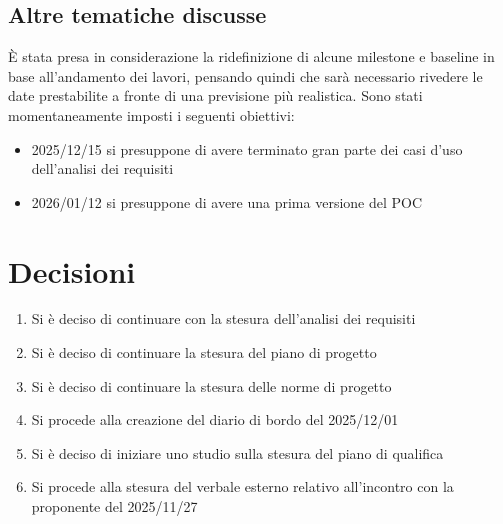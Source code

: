 \documentclass[a4paper,12pt]{article}
\begin{document}
\subsection{Altre tematiche discusse}
È stata presa in considerazione la ridefinizione di alcune milestone e baseline in base all'andamento dei lavori, pensando quindi che sarà necessario rivedere le date prestabilite a fronte di una previsione più realistica.
Sono stati momentaneamente imposti i seguenti obiettivi:
\begin{itemize}[noitemsep]
    \item 2025/12/15 si presuppone di avere terminato gran parte dei casi d'uso dell'analisi dei requisiti
    \item 2026/01/12 si presuppone di avere una prima versione del POC
\end{itemize}

\section{Decisioni}
\begin{enumerate}[noitemsep]
    \item Si è deciso di continuare con la stesura dell'analisi dei requisiti
    \item Si è deciso di continuare la stesura del piano di progetto
    \item Si è deciso di continuare la stesura delle norme di progetto
    \item Si procede alla creazione del diario di bordo del 2025/12/01
    \item Si è deciso di iniziare uno studio sulla stesura del piano di qualifica
    \item Si procede alla stesura del verbale esterno relativo all'incontro con la proponente del 2025/11/27

\end{enumerate}
\end{document}
